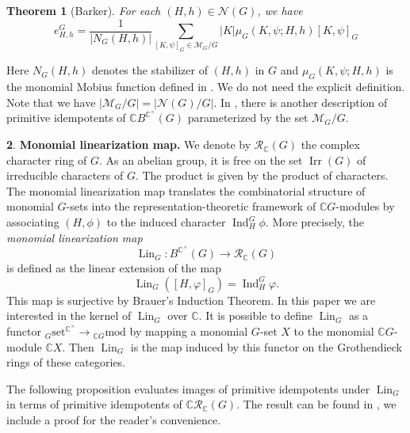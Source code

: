 \documentclass[12pt]{article}
\theoremstyle{plain}
\newtheorem{theorem}{Theorem}[section]
\theoremstyle{definition}
\newtheorem{nothing}[theorem]{}
\newcommand{\ling}{\operatorname{Lin}_G}
\newcommand{\MonG}{\mathbb C B^{\mathbb C^\times}(G)}
\newcommand{\ind}{\operatorname{Ind}}
\begin{document}
\begin{theorem}[Barker]
For each $(H, h)\in \mathcal N(G)$, we have 
\[ e_{H, h}^G = \frac{1}{|N_G(H, h)|}\sum_{[K, \psi]_G\in\mathcal M_G/G}|K|\mu_G(K, \psi; H, h) [K, \psi]_G\]         
\end{theorem}
\noindent
Here $N_G(H, h)$ denotes the stabilizer of $(H, h)$ in $G$ and $\mu_G(K, \psi; H, h)$ is the monomial Mobius function defined in \cite[Section 5]{Bar}. We do not need the explicit definition. Note that we have $|\mathcal M_G/G| = |\mathcal N(G)/G|$. In \cite{BoYi}, there is another description of primitive idempotents of $\MonG$ parameterized by the set $\mathcal M_G/G$. 

\begin{nothing} \textbf{Monomial linearization map.}
We denote by $\mathcal R_\mathbb C(G)$ the complex character ring of $G$. As an abelian group, it is free on the set $\operatorname{Irr}(G)$ of irreducible characters of $G$. The product is given by the product of characters. The monomial linearization map translates the combinatorial structure of monomial $G$-sets into the representation-theoretic framework of $\mathbb CG$-modules by associating $(H, \phi)$ to the induced character $\ind_H^G\phi$. More precisely, the \emph{monomial linearization map}
\[
\ling \colon B^{\mathbb{C}^\times}(G) \to \mathcal{R}_{\mathbb{C}}(G)
\]
is defined as the linear extension of the map
\[
\ling([H, \varphi]_G) = \operatorname{Ind}_H^G \varphi.
\]
This map is surjective by Brauer's Induction Theorem. In this paper we are interested in the kernel of $\ling$ over $\mathbb C$. It is possible to define $\ling$ as a functor ${}_G\text{set}^{\mathbb C^\times} \to {}_{\mathbb CG}\text{mod}$ by mapping a monomial $G$-set $X$ to the monomial $\mathbb CG$-module $\mathbb CX$. Then $\ling$ is the map induced by this functor on the Grothendieck rings of these categories.


The following proposition evaluates images of primitive idempotents under $\ling$ in terms of primitive idempotents of $\mathbb C\mathcal{R}_\mathbb C (G)$. The result can be found in \cite{Bpre}, we include a proof for the reader's convenience.
\end{nothing}
\end{document}
